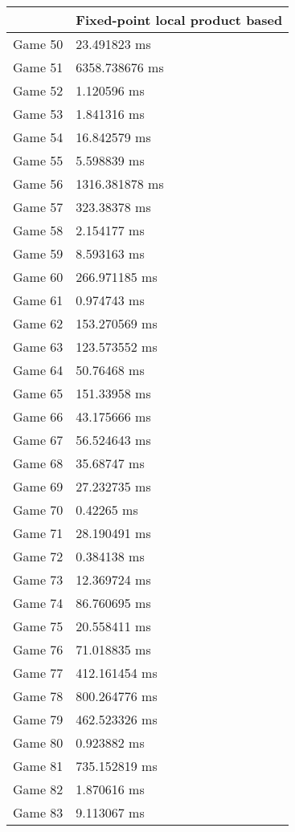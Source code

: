 \begin{tabular}{|l|l|}
	\hline
	& Fixed-point local product based \\ \hline
	Game 50 & 23.491823 ms \\ \hline
	Game 51 & 6358.738676 ms \\ \hline
	Game 52 & 1.120596 ms \\ \hline
	Game 53 & 1.841316 ms \\ \hline
	Game 54 & 16.842579 ms \\ \hline
	Game 55 & 5.598839 ms \\ \hline
	Game 56 & 1316.381878 ms \\ \hline
	Game 57 & 323.38378 ms \\ \hline
	Game 58 & 2.154177 ms \\ \hline
	Game 59 & 8.593163 ms \\ \hline
	Game 60 & 266.971185 ms \\ \hline
	Game 61 & 0.974743 ms \\ \hline
	Game 62 & 153.270569 ms \\ \hline
	Game 63 & 123.573552 ms \\ \hline
	Game 64 & 50.76468 ms \\ \hline
	Game 65 & 151.33958 ms \\ \hline
	Game 66 & 43.175666 ms \\ \hline
	Game 67 & 56.524643 ms \\ \hline
	Game 68 & 35.68747 ms \\ \hline
	Game 69 & 27.232735 ms \\ \hline
	Game 70 & 0.42265 ms \\ \hline
	Game 71 & 28.190491 ms \\ \hline
	Game 72 & 0.384138 ms \\ \hline
	Game 73 & 12.369724 ms \\ \hline
	Game 74 & 86.760695 ms \\ \hline
	Game 75 & 20.558411 ms \\ \hline
	Game 76 & 71.018835 ms \\ \hline
	Game 77 & 412.161454 ms \\ \hline
	Game 78 & 800.264776 ms \\ \hline
	Game 79 & 462.523326 ms \\ \hline
	Game 80 & 0.923882 ms \\ \hline
	Game 81 & 735.152819 ms \\ \hline
	Game 82 & 1.870616 ms \\ \hline
	Game 83 & 9.113067 ms \\ \hline

\end{tabular}
